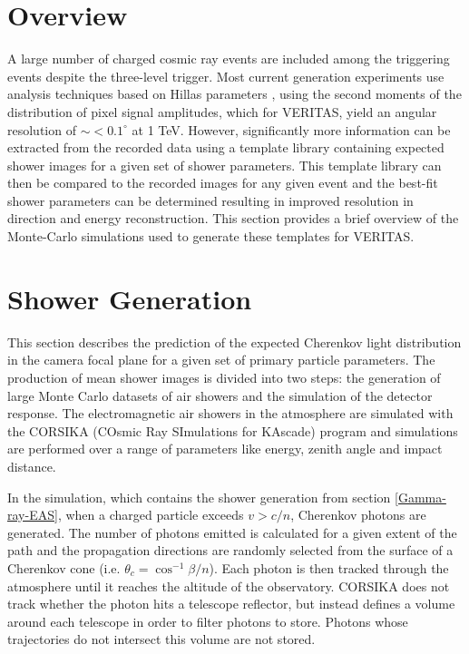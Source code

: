 \documentclass[main.tex]{subfiles}
\begin{document}
\section{Overview}
A large number of charged cosmic ray events are included among the triggering events despite the three-level trigger. Most current generation experiments use analysis techniques based on Hillas parameters \cite{Hillas:1985}, using the second moments of the distribution of pixel signal amplitudes, which for VERITAS, yield an angular resolution of $\sim <0.1^\circ$ at 1 TeV. However, significantly more information can be extracted from the recorded data using a template library containing expected shower images for a given set of shower parameters. This template library can then be compared to the recorded images for any given event and the best-fit shower parameters can be determined resulting in improved resolution in direction and energy reconstruction. This section provides a brief overview of the Monte-Carlo simulations used to generate these templates for VERITAS.

\section{Shower Generation}
This section describes the prediction of the expected Cherenkov light distribution in the camera focal plane for a given set of primary particle parameters. The production of mean shower images is divided into two steps: the generation of large Monte Carlo datasets of air showers and the simulation of the detector response. The electromagnetic air showers in the atmosphere are simulated with the CORSIKA (COsmic Ray SImulations for KAscade) \cite{Heck:2000nv} program and simulations are performed over a range of parameters like energy, zenith angle and impact distance. 

In the simulation, which contains the shower generation from section \ref{Gamma-ray-EAS}, when a charged particle exceeds $v>c/n$, Cherenkov photons are generated. The number of photons emitted is calculated for a given extent of the path and the propagation directions are randomly selected from the surface of a Cherenkov cone (i.e. $\theta_c = \cos^{-1}\beta/n$). Each photon is then tracked through the atmosphere until it reaches the altitude of the observatory. CORSIKA does not track whether the photon hits a telescope reflector, but instead defines a volume around each telescope in order to filter photons to store. Photons whose trajectories do not intersect this volume are not stored.
\end{document}
